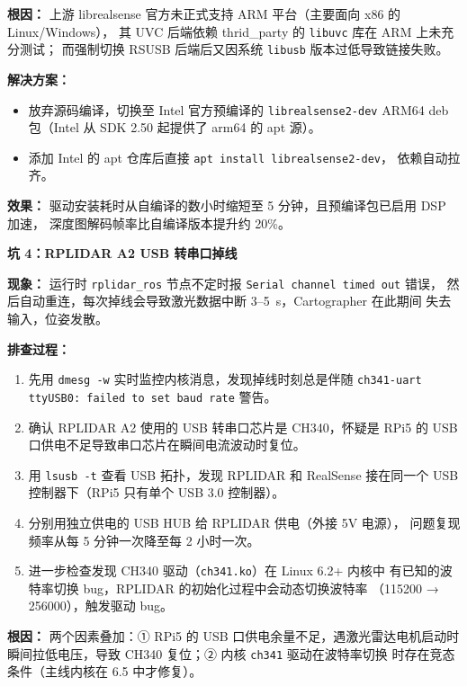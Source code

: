 \documentclass[11pt,a4paper]{article}
\begin{document}
\textbf{根因：}
上游 librealsense 官方未正式支持 ARM 平台（主要面向 x86 的 Linux/Windows），
其 UVC 后端依赖 thrid\_party 的 \texttt{libuvc} 库在 ARM 上未充分测试；
而强制切换 RSUSB 后端后又因系统 \texttt{libusb} 版本过低导致链接失败。

\textbf{解决方案：}
\begin{itemize}
  \item 放弃源码编译，切换至 Intel 官方预编译的 \texttt{librealsense2-dev}
        ARM64 deb 包（Intel 从 SDK 2.50 起提供了 arm64 的 apt 源）。
  \item 添加 Intel 的 apt 仓库后直接 \texttt{apt install librealsense2-dev}，
        依赖自动拉齐。
\end{itemize}

\textbf{效果：}
驱动安装耗时从自编译的数小时缩短至 5 分钟，且预编译包已启用 DSP 加速，
深度图解码帧率比自编译版本提升约 20\%。

\vspace{2em}

\textbf{坑 4：RPLIDAR A2 USB 转串口掉线}

\textbf{现象：}
运行时 \texttt{rplidar\_ros} 节点不定时报 \texttt{Serial channel timed out} 错误，
然后自动重连，每次掉线会导致激光数据中断 3--5~s，Cartographer 在此期间
失去输入，位姿发散。

\textbf{排查过程：}
\begin{enumerate}
  \item 先用 \texttt{dmesg -w} 实时监控内核消息，发现掉线时刻总是伴随
        \texttt{ch341-uart ttyUSB0: failed to set baud rate} 警告。
  \item 确认 RPLIDAR A2 使用的 USB 转串口芯片是 CH340，怀疑是 RPi5 的
        USB 口供电不足导致串口芯片在瞬间电流波动时复位。
  \item 用 \texttt{lsusb -t} 查看 USB 拓扑，发现 RPLIDAR 和 RealSense
        接在同一个 USB 控制器下（RPi5 只有单个 USB 3.0 控制器）。
  \item 分别用独立供电的 USB HUB 给 RPLIDAR 供电（外接 5V 电源），
        问题复现频率从每 5 分钟一次降至每 2 小时一次。
  \item 进一步检查发现 CH340 驱动（\texttt{ch341.ko}）在 Linux 6.2+ 内核中
        有已知的波特率切换 bug，RPLIDAR 的初始化过程中会动态切换波特率
        （115200 → 256000），触发驱动 bug。
\end{enumerate}

\textbf{根因：}
两个因素叠加：① RPi5 的 USB 口供电余量不足，遇激光雷达电机启动时
瞬间拉低电压，导致 CH340 复位；② 内核 \texttt{ch341} 驱动在波特率切换
时存在竞态条件（主线内核在 6.5 中才修复）。
\end{document}
